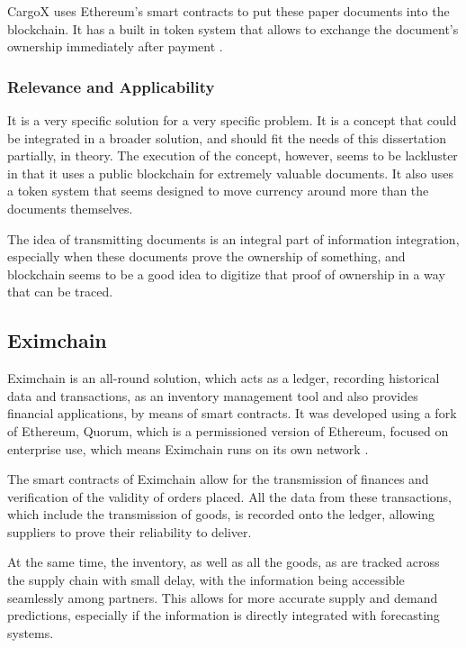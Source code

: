 CargoX uses Ethereum's smart contracts to put these paper documents into the blockchain. It has a built in token system that allows to exchange the document's ownership immediately after payment \cite{CargoX2017}.

\subsubsection{Relevance and Applicability}
It is a very specific solution for a very specific problem. It is a concept that could be integrated in a broader solution, and should fit the needs of this dissertation partially, in theory. The execution of the concept, however, seems to be lackluster in that it uses a public blockchain for extremely valuable documents.  It also uses a token system that seems designed to move currency around more than the documents themselves.

The idea of transmitting documents is an integral part of information integration, especially when these documents prove the ownership of something, and blockchain seems to be a good idea to digitize that proof of ownership in a way that can be traced.

\subsection{Eximchain}
Eximchain is an all-round solution, which acts as a ledger, recording historical data and transactions, as an inventory management tool and also provides financial applications, by means of smart contracts. It was developed using a fork of Ethereum, Quorum, which is a permissioned version of Ethereum, focused on enterprise use, which means Eximchain runs on its own network \cite{Huertas2017}.


The smart contracts of Eximchain allow for the transmission of finances and verification of the validity of orders placed. All the data from these transactions, which include the transmission of goods, is recorded onto the ledger, allowing suppliers to prove their reliability to deliver. 


At the same time, the inventory, as well as all the goods, as are tracked across the supply chain with small delay, with the information being accessible seamlessly among partners. This allows for more accurate supply and demand predictions, especially if the information is directly integrated with forecasting systems.

